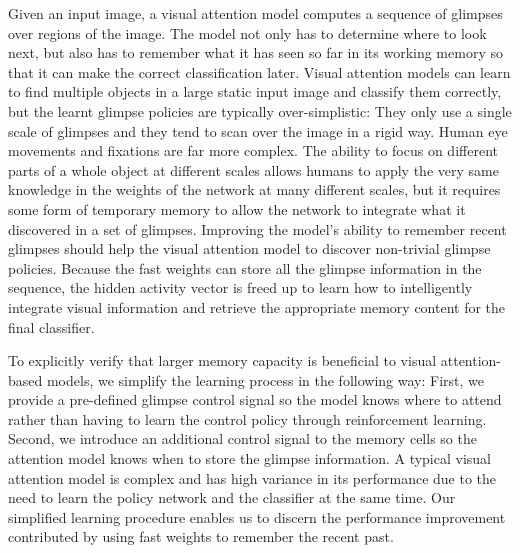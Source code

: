 \documentclass{article}
\begin{document}
Given an input image, a visual attention model computes a sequence of glimpses over regions of the image. The model not only has to determine where to look next, but also has to remember what it has seen so far in its working memory so that it can make  the correct classification later. Visual attention models can learn to find multiple objects in a large static input image and classify them correctly, but the learnt glimpse policies are typically over-simplistic: They only use a single scale of glimpses and they tend to scan over the image in a rigid way.  Human eye movements and fixations are far more complex. The ability to focus on different parts of a whole object at different scales allows humans to apply the very same knowledge in the weights of the network at many different scales, but it requires some form of temporary memory  to allow the network to integrate what it discovered in a set of glimpses.  Improving the model's ability to remember recent glimpses should help the visual attention model to discover non-trivial glimpse policies. Because the fast weights can store all the glimpse information in the sequence, the hidden activity vector is freed up to learn how to intelligently integrate visual information and retrieve the appropriate memory content for the final classifier. 

To explicitly verify that larger memory capacity is beneficial to visual attention-based models, we simplify the learning process in the following way: First, we provide a pre-defined glimpse control signal so the model knows where to attend rather than having to learn the control policy through reinforcement learning.  Second, we introduce an additional control signal to the memory cells so the attention model knows when to store the glimpse information. A typical visual attention model is complex and has high variance in its performance due to the need to learn the policy network and the classifier at the same time. Our simplified learning procedure enables us to discern the performance improvement contributed by using fast weights to remember the recent past.
\end{document}
